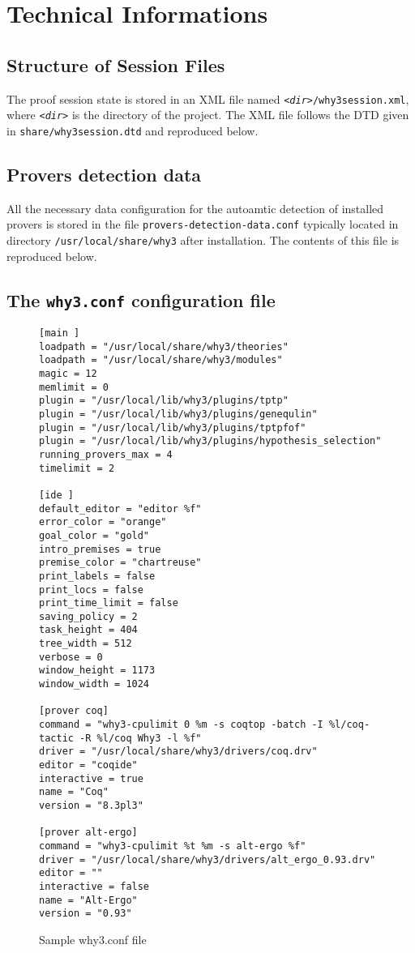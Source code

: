 \chapter{Technical Informations}


\section{Structure of Session Files}

The proof session state is stored in an XML file named
\texttt{\textsl{<dir>}/why3session.xml}, where \texttt{\textsl{<dir>}}
is the directory of the project.
The XML file follows the DTD given in \texttt{share/why3session.dtd} and reproduced below.



\section{Provers detection data}
\label{sec:proverdetecttiondata}

All the necessary data configuration for the autoamtic detection of
installed provers is stored in the file
\texttt{provers-detection-data.conf} typically located in directory
\verb|/usr/local/share/why3| after installation. The contents of this
file is reproduced below.
{\footnotesize}

\section{The \texttt{why3.conf} configuration file}
\label{sec:whyconffile}

\begin{figure}[p]
{\footnotesize
\begin{verbatim}
[main ]
loadpath = "/usr/local/share/why3/theories"
loadpath = "/usr/local/share/why3/modules"
magic = 12
memlimit = 0
plugin = "/usr/local/lib/why3/plugins/tptp"
plugin = "/usr/local/lib/why3/plugins/genequlin"
plugin = "/usr/local/lib/why3/plugins/tptpfof"
plugin = "/usr/local/lib/why3/plugins/hypothesis_selection"
running_provers_max = 4
timelimit = 2

[ide ]
default_editor = "editor %f"
error_color = "orange"
goal_color = "gold"
intro_premises = true
premise_color = "chartreuse"
print_labels = false
print_locs = false
print_time_limit = false
saving_policy = 2
task_height = 404
tree_width = 512
verbose = 0
window_height = 1173
window_width = 1024

[prover coq]
command = "why3-cpulimit 0 %m -s coqtop -batch -I %l/coq-tactic -R %l/coq Why3 -l %f"
driver = "/usr/local/share/why3/drivers/coq.drv"
editor = "coqide"
interactive = true
name = "Coq"
version = "8.3pl3"

[prover alt-ergo]
command = "why3-cpulimit %t %m -s alt-ergo %f"
driver = "/usr/local/share/why3/drivers/alt_ergo_0.93.drv"
editor = ""
interactive = false
name = "Alt-Ergo"
version = "0.93"
\end{verbatim}
}
  \caption{Sample why3.conf file}
\label{fig:why3conf}
\end{figure}




